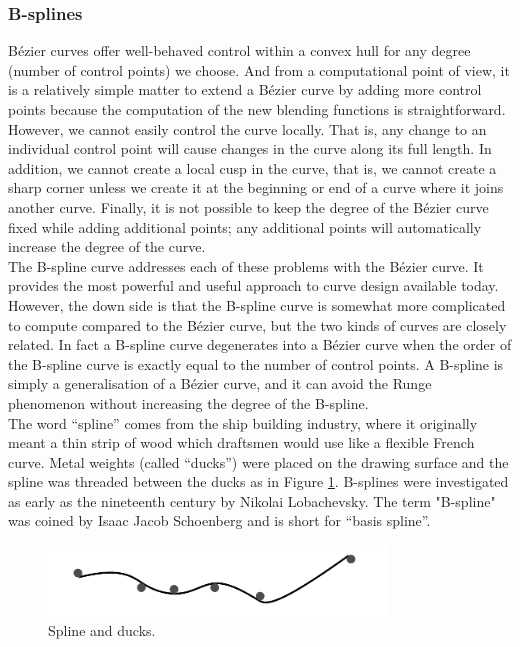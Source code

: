 \documentclass[]{usiinfbachelorproject}
\begin{document}
\subsubsection{B-splines} \label{sec:bsplines}

B\'ezier curves offer well-behaved control within a convex hull for any degree (number of control points) we choose. And from a computational point of view, it is a relatively simple matter to extend a B\'ezier curve by adding more control points because the computation of the new blending functions is straightforward. \\
However, we cannot easily control the curve locally. That is, any change to an individual control point will cause changes in the curve along its full length. In addition, we cannot create a local cusp in the curve, that is, we cannot create a sharp corner unless we create it at the beginning or end of a curve where it joins another curve. Finally, it is not possible to keep the degree of the 
B\'ezier curve fixed while adding additional points; any additional points will automatically increase the degree of the curve. \\
The B-spline curve \cite{Boor1978} addresses each of these problems with the B\'ezier curve. It provides the most powerful and useful approach to curve design available today. However, the down side is that the B-spline curve is somewhat more complicated to compute compared to the B\'ezier curve, but the two kinds of curves are closely related. In fact a B-spline curve degenerates into a B\'ezier curve when the order of the B-spline curve is exactly equal to the number of control points. A B-spline is simply a generalisation of a B\'ezier curve, and it can avoid the Runge phenomenon without increasing the degree of the B-spline.\\

\noindent The word ``spline'' comes from the ship building industry, where it originally meant a thin strip of wood which draftsmen would use like a flexible French curve. Metal weights (called ``ducks'') were placed on the drawing surface and the spline was threaded between the ducks as in Figure \ref{fig:ducks}. B-splines were investigated as early as the nineteenth century by Nikolai Lobachevsky. The term "B-spline" was coined by Isaac Jacob Schoenberg and is short for ``basis spline''.\\

\begin{figure}[ht]
	\centering
	\includegraphics[width=0.8\textwidth]{img/ducks.png}
	\caption{Spline and ducks.}
	\label{fig:ducks}
\end{figure}
\end{document}
